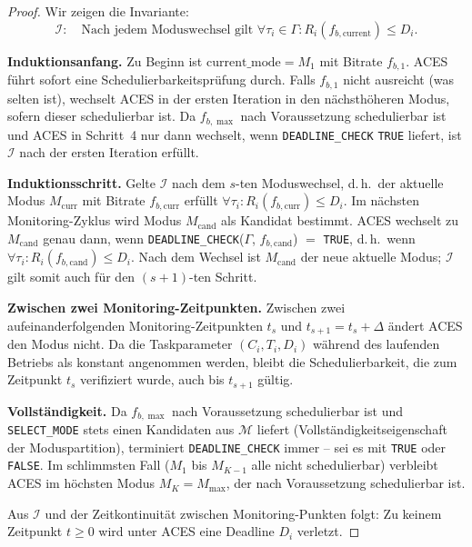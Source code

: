 ﻿\documentclass[a4paper,12pt]{article}
\theoremstyle{definition}
\begin{document}
\begin{proof}
Wir zeigen die Invariante:
\[
    \mathcal{I}: \quad \text{Nach jedem Moduswechsel gilt } \forall \tau_i \in \Gamma: R_i(f_{b,\mathrm{current}}) \leq D_i.
\]

\textbf{Induktionsanfang.}
Zu Beginn ist $\mathrm{current\_mode} = M_1$ mit Bitrate $f_{b,1}$.
ACES f\"{u}hrt sofort eine Schedulierbarkeitspr\"{u}fung durch.
Falls $f_{b,1}$ nicht ausreicht (was selten ist), wechselt ACES in der ersten
Iteration in den n\"{a}chsth\"{o}heren Modus, sofern dieser schedulierbar ist.
Da $f_{b,\max}$ nach Voraussetzung schedulierbar ist und ACES in Schritt~4 nur
dann wechselt, wenn \texttt{DEADLINE\_CHECK} \texttt{TRUE} liefert, ist $\mathcal{I}$
nach der ersten Iteration erf\"{u}llt.

\textbf{Induktionsschritt.}
Gelte $\mathcal{I}$ nach dem $s$-ten Moduswechsel, d.\,h.\ der aktuelle Modus
$M_{\mathrm{curr}}$ mit Bitrate $f_{b,\mathrm{curr}}$ erf\"{u}llt
$\forall \tau_i: R_i(f_{b,\mathrm{curr}}) \leq D_i$.
Im n\"{a}chsten Monitoring-Zyklus wird Modus $M_{\mathrm{cand}}$ als Kandidat
bestimmt.
ACES wechselt zu $M_{\mathrm{cand}}$ genau dann, wenn
\texttt{DEADLINE\_CHECK}($\Gamma$, $f_{b,\mathrm{cand}}$) $=$ \texttt{TRUE},
d.\,h.\ wenn $\forall \tau_i: R_i(f_{b,\mathrm{cand}}) \leq D_i$.
Nach dem Wechsel ist $M_{\mathrm{cand}}$ der neue aktuelle Modus;
$\mathcal{I}$ gilt somit auch f\"{u}r den $(s+1)$-ten Schritt.

\textbf{Zwischen zwei Monitoring-Zeitpunkten.}
Zwischen zwei aufeinanderfolgenden Monitoring-Zeitpunkten $t_s$ und $t_{s+1} = t_s + \Delta$
\"{a}ndert ACES den Modus nicht.
Da die Taskparameter $(C_i, T_i, D_i)$ w\"{a}hrend des laufenden Betriebs als
konstant angenommen werden, bleibt die Schedulierbarkeit, die zum Zeitpunkt $t_s$
verifiziert wurde, auch bis $t_{s+1}$ g\"{u}ltig.

\textbf{Vollst\"{a}ndigkeit.}
Da $f_{b,\max}$ nach Voraussetzung schedulierbar ist und \texttt{SELECT\_MODE} stets
einen Kandidaten aus $\mathcal{M}$ liefert (Vollst\"{a}ndigkeitseigenschaft der
Moduspartition), terminiert \texttt{DEADLINE\_CHECK} immer -- sei es mit \texttt{TRUE}
oder \texttt{FALSE}.
Im schlimmsten Fall ($M_1$ bis $M_{K-1}$ alle nicht schedulierbar) verbleibt
ACES im h\"{o}chsten Modus $M_K = M_{\max}$, der nach Voraussetzung schedulierbar ist.

Aus $\mathcal{I}$ und der Zeitkontinuit\"{a}t zwischen Monitoring-Punkten folgt:
Zu keinem Zeitpunkt $t \geq 0$ wird unter ACES eine Deadline $D_i$ verletzt.
\end{proof}
\end{document}
